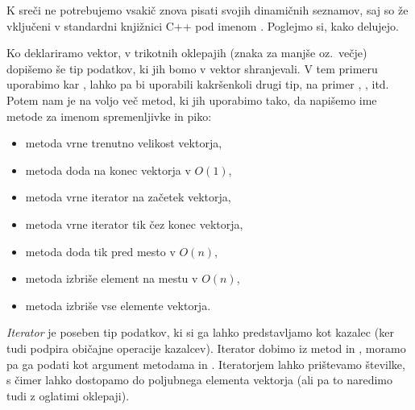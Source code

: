 
K sreči ne potrebujemo vsakič znova pisati svojih dinamičnih seznamov, saj so že
vključeni v standardni knjižnici C++ pod imenom .
Poglejmo si, kako delujejo.


Ko deklariramo vektor, v trikotnih oklepajih (znaka za manjše oz.~večje)
dopišemo še tip podatkov, ki jih bomo v vektor shranjevali.
V tem primeru uporabimo kar , lahko pa bi uporabili kakršenkoli drugi
tip, na primer , ,  itd.
Potem nam je na voljo več metod, ki jih uporabimo tako, da napišemo ime metode
za imenom spremenljivke in piko:
\begin{itemize}
\item metoda  vrne trenutno velikost vektorja,
\item metoda  doda  na konec vektorja v $O(1)$,
\item metoda  vrne iterator na začetek vektorja,
\item metoda  vrne iterator tik čez konec vektorja,
\item metoda  doda  tik pred mesto  v
  $O(n)$,
\item metoda  izbriše element na mestu  v $O(n)$,
\item metoda  izbriše vse elemente vektorja.
\end{itemize}
\emph{Iterator} je poseben tip podatkov, ki si ga lahko predstavljamo kot
kazalec (ker tudi podpira običajne operacije kazalcev).
Iterator dobimo iz metod  in , moramo pa ga podati kot
argument metodama  in .
Iteratorjem lahko prištevamo številke, s čimer lahko dostopamo do poljubnega
elementa vektorja (ali pa to naredimo tudi z oglatimi oklepaji).





